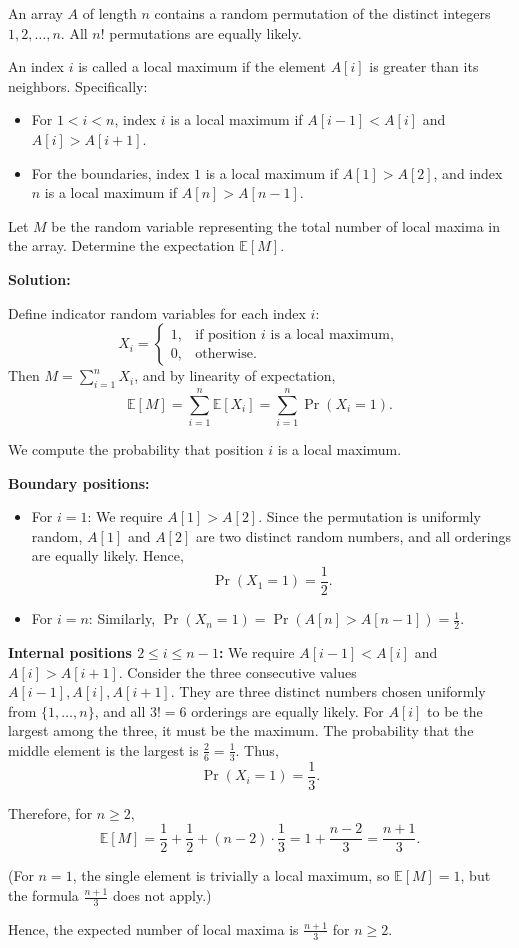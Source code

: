 \problem{}
An array $A$ of length $n$ contains a random permutation of the distinct integers $1, 2, \dots, n$. All $n!$ permutations are equally likely.

An index $i$ is called a local maximum if the element $A[i]$ is greater than its neighbors. Specifically: \begin{itemize} \item For $1 < i < n$, index $i$ is a local maximum if $A[i-1] < A[i]$ and $A[i] > A[i+1]$. \item For the boundaries, index $1$ is a local maximum if $A[1] > A[2]$, and index $n$ is a local maximum if $A[n] > A[n-1]$. \end{itemize}

Let $M$ be the random variable representing the total number of local maxima in the array. Determine the expectation $\mathbb{E}[M]$.

\noindent \textbf{Solution:}



Define indicator random variables for each index \(i\):
\[
X_i = \begin{cases}
1, & \text{if position } i \text{ is a local maximum},\\
0, & \text{otherwise}.
\end{cases}
\]
Then \(M = \sum_{i=1}^n X_i\), and by linearity of expectation,
\[
\mathbb{E}[M] = \sum_{i=1}^n \mathbb{E}[X_i] = \sum_{i=1}^n \Pr(X_i = 1).
\]

We compute the probability that position \(i\) is a local maximum.

\noindent\textbf{Boundary positions:}
\begin{itemize}
    \item For \(i = 1\): We require \(A[1] > A[2]\). Since the permutation is uniformly random, \(A[1]\) and \(A[2]\) are two distinct random numbers, and all orderings are equally likely. Hence,
    \[
    \Pr(X_1 = 1) = \frac{1}{2}.
    \]
    \item For \(i = n\): Similarly, \(\Pr(X_n = 1) = \Pr(A[n] > A[n-1]) = \frac{1}{2}\).
\end{itemize}

\noindent\textbf{Internal positions \(2 \leq i \leq n-1\):}
We require \(A[i-1] < A[i]\) and \(A[i] > A[i+1]\). Consider the three consecutive values \(A[i-1], A[i], A[i+1]\). They are three distinct numbers chosen uniformly from \(\{1,\dots,n\}\), and all \(3! = 6\) orderings are equally likely. For \(A[i]\) to be the largest among the three, it must be the maximum. The probability that the middle element is the largest is \(\frac{2}{6} = \frac{1}{3}\). Thus,
\[
\Pr(X_i = 1) = \frac{1}{3}.
\]

Therefore, for \(n \ge 2\),
\[
\mathbb{E}[M] = \frac{1}{2} + \frac{1}{2} + (n-2)\cdot\frac{1}{3} = 1 + \frac{n-2}{3} = \frac{n+1}{3}.
\]

(For \(n = 1\), the single element is trivially a local maximum, so \(\mathbb{E}[M] = 1\), but the formula \(\frac{n+1}{3}\) does not apply.)

Hence, the expected number of local maxima is \({\frac{n+1}{3}}\) for \(n \ge 2\).



\newpage